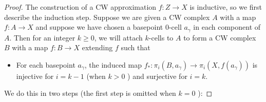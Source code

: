 \begin{proof}
    The construction of a CW approximation
    $f \colon Z \to X$ is inductive, so we first
    describe the induction step. 
    Suppose we are given a CW complex $A$ with a map
    $f \colon A \to X$ and suppose
    we have chosen a basepoint $0$-cell $a_{\gamma}$ in
    each component of $A$.
    Then for an integer $k\ge 0$, we will attach
    $k$-cells to $A$ to form a CW complex
    $B$ with a map $f \colon B \to X$ extending $f$ such that
    \begin{itemize}
        \item For each basepoint $a_{\gamma}$, the
            induced map $f_* \colon
            \pi_i \left( B, a_{\gamma} \right) 
            \to \pi_i \left( X, f\left( a_{\gamma} \right) 
            \right) $ is injective for
            $i = k-1$ (when $k>0$ ) and surjective
            for $i = k$.
    \end{itemize}

    We do this in two steps (the first step is omitted
    when $k= 0$ ):


\end{proof}
